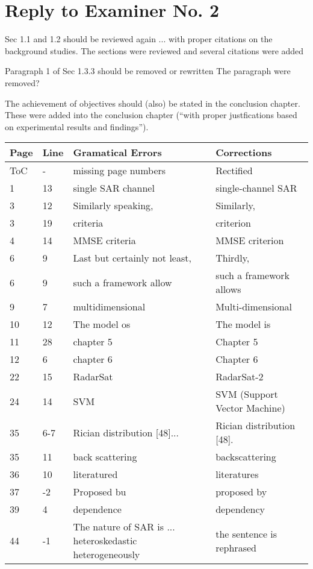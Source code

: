 \section*{Reply to Examiner No. 2}

\begin{replyheader}
\end{replyheader}  

\replyToComment
    {Sec 1.1 and 1.2 should be reviewed again ... with proper citations on the background studies.}
    {The sections were reviewed and several citations were added}

\replyToComment
    {Paragraph 1 of Sec 1.3.3 should be removed or rewritten}
    {The paragraph were removed?}
    
\replyToComment
    {The achievement of objectives should (also) be stated in the conclusion chapter. }
    {These were added into the conclusion chapter (``with proper justfications based on experimental results and findings'').}

\noindent
\begin{longtable}[c]{p{}|p{}|p{}|p{}}
\textbf{Page} & \textbf{Line} & \textbf{Gramatical Errors} & \textbf{Corrections} \\
 \hline
 \endhead
ToC & - & missing page numbers & Rectified \\
1 & 13 & single SAR channel & single-channel SAR \\ 
3 & 12 & Similarly speaking, & Similarly, \\
3 & 19 & criteria & criterion \\ 
4 & 14 & MMSE criteria & MMSE criterion \\
6 & 9 & Last but certainly not least, & Thirdly, \\ 
6 & 9 & such a framework allow & such a framework allows \\
9 & 7 & multidimensional & Multi-dimensional \\
10 & 12 & The model os & The model is \\
11 & 28 & chapter 5 & Chapter 5 \\
12 & 6 & chapter 6 & Chapter 6 \\
22 & 15 & RadarSat & RadarSat-2 \\
24 & 14 & SVM & SVM (Support Vector Machine) \\
35 & 6-7 & Rician distribution [48]... & Rician distribution [48]. \\
35 & 11 & back scattering & backscattering \\
36 & 10 & literatured & literatures \\
37 & -2 & Proposed bu & proposed by \\
39 & 4 & dependence & dependency \\
44 & -1 & The nature of SAR is ... heteroskedastic heterogeneously & the sentence is rephrased \\
\end{longtable}    

